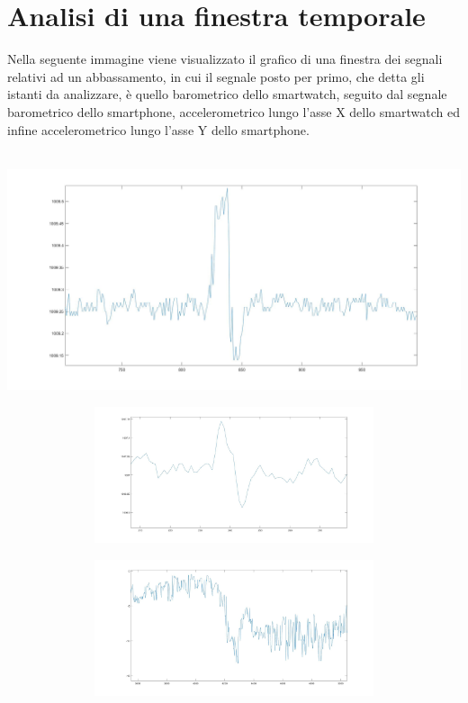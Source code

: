 \documentclass[a4paper, oneside]{book}
\begin{document}
\section{Analisi di una finestra temporale}
Nella seguente immagine viene visualizzato il grafico di una finestra dei segnali relativi ad un abbassamento, in cui il segnale posto per primo, che detta gli istanti da analizzare, è quello barometrico dello smartwatch, seguito dal segnale barometrico dello smartphone, accelerometrico lungo l'asse X dello smartwatch ed infine accelerometrico lungo l'asse Y dello smartphone.\\ \\
\begin{minipage}{\linewidth}
\begin{center}
\vspace{1mm}
\includegraphics[width=154mm, height= 65mm]{./images/finestra_abbassamento/pressure_watch.jpg} 
\end{center}
\end{minipage}
\begin{minipage}{\linewidth}
\begin{center}
\includegraphics[width=154mm, height= 40mm]{./images/finestra_abbassamento/pressure_phone.jpg} 
\end{center}
\end{minipage}
\begin{minipage}{\linewidth}
\begin{center}
\includegraphics[width=154mm, height= 40mm]{./images/finestra_abbassamento/accelerometr_watchX.jpg} 
\end{center}
\end{minipage}
\end{document}
